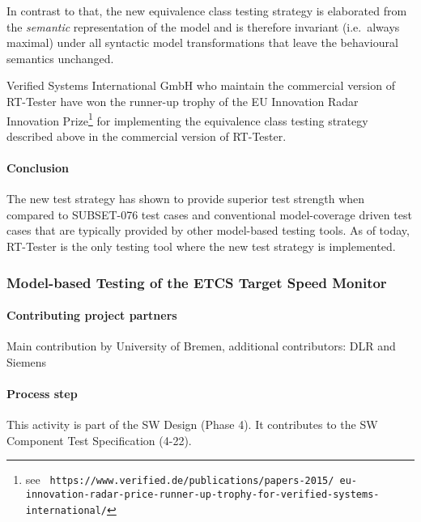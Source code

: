 In contrast to that, the new equivalence class testing strategy is
elaborated from the {\it semantic} representation of the model and is
therefore invariant (i.e.~always maximal) under all syntactic model
transformations that leave the behavioural semantics unchanged.

Verified Systems International GmbH who maintain the commercial
version of RT-Tester have won the runner-up trophy of the EU
Innovation Radar Innovation Prize\footnote{see {\tt
    https://www.verified.de/publications/papers-2015/\newline
    eu-innovation-radar-price-runner-up-trophy-for-verified-systems-international/}}
for implementing the equivalence class testing strategy described
above in the commercial version of RT-Tester.

\paragraph{Conclusion}

The new test strategy has shown to provide superior test strength when
compared to SUBSET-076 test cases and conventional model-coverage
driven test cases that are typically provided by other model-based
testing tools. As of today, RT-Tester is the only testing tool where
the new test strategy is implemented.


\subsubsection{Model-based Testing of the ETCS Target Speed Monitor}
\label{sec:targetspeedmonitorbremen}

\paragraph{Contributing project partners}
Main contribution by University of Bremen, additional contributors: DLR and Siemens 

\paragraph{Process step}
This activity is part of the SW Design (Phase 4). It
contributes to the SW Component Test
Specification (4-22). 

